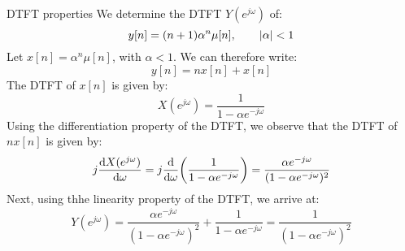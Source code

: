 \documentclass[../../main/main.tex]{subfiles}
\begin{document}

\begin{example}{DTFT properties}{}
    We determine the DTFT \( Y(e^{j\omega}) \) of:
    \begin{equation}
        y[n]
        =
        (n+1) \alpha^{n} \mu[n],
        \qquad
        \abs{\alpha} < 1
        \label{eq:L09_S03_1}
    \end{equation}
    Let \( x[n] = \alpha^{n} \mu[n] \), with \( \alpha < 1 \). We can therefore write:
    \begin{equation}
        y[n]
        =
        nx[n] + x[n]
        \label{eq:L09_S03_2}
    \end{equation}
    The DTFT of \( x[n] \) is given by:
    \begin{equation}
        X(e^{j\omega})
        =
        \frac{1}{1 - \alpha e^{-j\omega}}
        \label{eq:L09_S03_3}
    \end{equation}
    Using the differentiation property of the DTFT, we observe that the DTFT of \( nx[n] \) is given by:
    \begin{equation}
        j \dv{X(e^{j\omega})}{\omega}
        =
        j
        \dv{}{\omega} \qty(\frac{1}{1 - \alpha e^{-j\omega}})
        =
        \frac{\alpha e^{-j\omega}}{(1 - \alpha e^{-j\omega})^2}
        \label{eq:L09_S04_1}
    \end{equation}
    Next, using thhe linearity property of the DTFT, we arrive at:
    \begin{equation}
        Y(e^{j\omega})
        =
        \frac{\alpha e^{-j\omega}}{(1 - \alpha e^{-j\omega})^2} + \frac{1}{1 - \alpha e^{-j\omega}}
        =
        \frac{1}{(1 - \alpha e^{-j\omega})^2}
        \label{eq:L09_S04_2}
    \end{equation}
\end{example}
\end{document}
